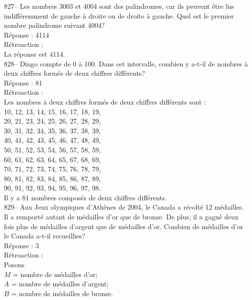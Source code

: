 ﻿\documentclass[letterpaper, 12pt]{article}
\begin{document}
827-- Les nombres 3003 et 4004 sont des palindromes, car ils peuvent \^etre
lus indiff\'eremment de gauche \`a droite ou de droite \`a gauche.  Quel est
le premier nombre palindrome suivant 4004?\\

R\'eponse : 4114\\

R\'etroaction :\\
La r\'eponse est 4114.\\

828-- Dingo compte de 0 \`a 100.  Dans cet intervalle, combien y a-t-il de
nombres \`a deux chiffres form\'es de deux chiffres diff\'erents?\\

R\'eponse : 81\\

R\'etroaction : \\
Les nombres \`a deux chiffres form\'es de deux chiffres diff\'erents sont :
\\
10, 12, 13, 14, 15, 16, 17, 18, 19, \\
20, 21, 23, 24, 25, 26, 27, 28, 29, \\
30, 31, 32, 34, 35, 36, 37, 38, 39, \\
40, 41, 42, 43, 45, 46, 47, 48, 49, \\
50, 51, 52, 53, 54, 56, 57, 58, 59, \\
60, 61, 62, 63, 64, 65, 67, 68, 69, \\
70, 71, 72, 73, 74, 75, 76, 78, 79, \\
80, 81, 82, 83, 84, 85, 86, 87, 89, \\
90, 91, 92, 93, 94, 95, 96, 97, 98. \\

Il y a 81 nombres compos\'es de deux chiffres diff\'erents.\\


829-- Aux Jeux olympiques d'Ath\`enes de 2004, le Canada a r\'ecolt\'e 12
m\'edailles.  Il a remport\'e autant de m\'edailles d'or que de bronze.  De
plus, il a gagn\'e  deux fois plus de m\'edailles d'argent que de
m\'edailles d'or.  Combien de m\'edailles d'or le Canada a-t-il
recueillies?\\

R\'eponse : 3\\

R\'etroaction : \\
Posons\\
$M$ = nombre de m\'edailles d'or;\\
$A$ = nombre de m\'edailles d'argent;\\
$B$ = nombre de m\'edailles de bronze.\\
\end{document}

